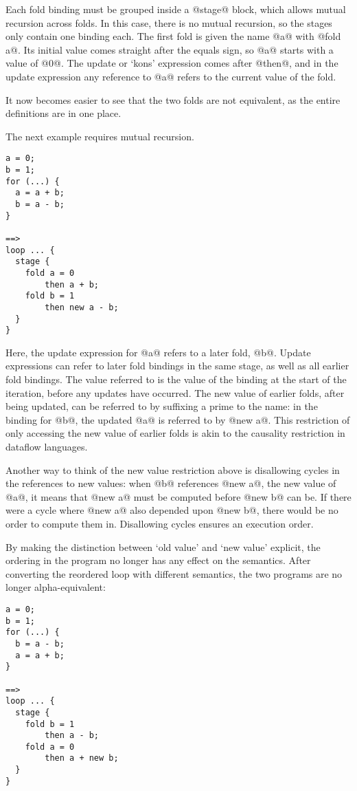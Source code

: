 Each fold binding must be grouped inside a @stage@ block, which allows mutual recursion across folds.
In this case, there is no mutual recursion, so the stages only contain one binding each.
The first fold is given the name @a@ with @fold a@.
Its initial value comes straight after the equals sign, so @a@ starts with a value of @0@.
The update or `kons' expression comes after @then@, and in the update expression any reference to @a@ refers to the current value of the fold.

It now becomes easier to see that the two folds are not equivalent, as the entire definitions are in one place.

The next example requires mutual recursion.
\begin{lstlisting}
a = 0;
b = 1;
for (...) {
  a = a + b;
  b = a - b;
}

==>
loop ... {
  stage {
    fold a = 0
        then a + b;
    fold b = 1
        then new a - b;
  }
}
\end{lstlisting}

Here, the update expression for @a@ refers to a later fold, @b@.
Update expressions can refer to later fold bindings in the same stage, as well as all earlier fold bindings.
The value referred to is the value of the binding at the start of the iteration, before any updates have occurred.
The new value of earlier folds, after being updated, can be referred to by suffixing a prime to the name: in the binding for @b@, the updated @a@ is referred to by @new a@.
This restriction of only accessing the new value of earlier folds is akin to the causality restriction in dataflow languages\cite{mandel2010lucy}.

Another way to think of the new value restriction above is disallowing cycles in the references to new values:
when @b@ references @new a@, the new value of @a@, it means that @new a@ must be computed before @new b@ can be.
If there were a cycle where @new a@ also depended upon @new b@, there would be no order to compute them in.
Disallowing cycles ensures an execution order.

By making the distinction between `old value' and `new value' explicit, the ordering in the program no longer has any effect on the semantics.
After converting the reordered loop with different semantics, the two programs are no longer alpha-equivalent:
\begin{lstlisting}
a = 0;
b = 1;
for (...) {
  b = a - b;
  a = a + b;
}

==>
loop ... {
  stage {
    fold b = 1
        then a - b;
    fold a = 0
        then a + new b;
  }
}
\end{lstlisting}

